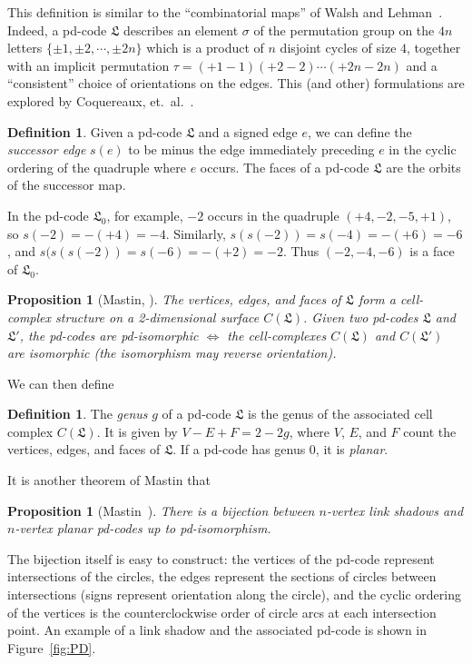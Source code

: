 \documentclass[amsmath,secnumarabic,floatfix,amssymb,nofootinbib,nobibnotes,letterpaper,11pt,tightenlines,showkeys]{revtex4}
\newtheorem{proposition}[theorem]{Proposition}
\theoremstyle{definition}
\newtheorem{definition}[theorem]{Definition}
\begin{document}
This definition is similar to the ``combinatorial maps'' of Walsh and Lehman~\cite{Walsh1972192}. Indeed, a pd-code $\mathfrak{L}$ describes an element $\sigma$ of the permutation group on the $4n$ letters $\{\pm1,\pm2,\cdots,\pm2n\}$ which is a product of $n$ disjoint cycles of size $4$, together with an implicit permutation $\tau = (+1 -1)(+2 -2)\cdots(+2n -2n)$ and a ``consistent'' choice of orientations on the edges. This (and other) formulations are explored by Coquereaux, et.\ al.~\cite{Coquereaux:2015wv}.
\begin{definition}
Given a pd-code $\mathfrak{L}$ and a signed edge $e$, we can define the \emph{successor edge} $s(e)$ to be minus the edge immediately preceding $e$ in the cyclic ordering of the quadruple where $e$ occurs. The faces of a pd-code $\mathfrak{L}$ are the orbits of the successor map.
\end{definition}
In the pd-code $\mathfrak{L}_0$, for example, $-2$ occurs in the quadruple $(+4,-2,-5,+1)$, so $s(-2) = -(+4) = -4$. Similarly, $s(s(-2)) = s(-4) = -(+6) = -6$, and $s(s(s(-2)) = s(-6) = -(+2) = -2$. Thus $(-2,-4,-6)$ is a face of $\mathfrak{L}_0$. 
\begin{proposition}[Mastin, \cite{Mastin:2015ii}] 
The vertices, edges, and faces of $\mathfrak{L}$ form a cell-complex structure on a 2-dimensional surface $C(\mathfrak{L})$. Given two pd-codes $\mathfrak{L}$ and $\mathfrak{L'}$, the pd-codes are pd-isomorphic $\iff$ the cell-complexes $C(\mathfrak{L})$ and $C(\mathfrak{L}')$ are isomorphic (the isomorphism may reverse orientation).
\end{proposition}
We can then define
\begin{definition}
The \emph{genus} $g$ of a pd-code $\mathfrak{L}$ is the genus of the associated cell complex $C(\mathfrak{L})$. It is given by $V - E + F = 2 - 2g$, where $V$, $E$, and $F$ count the vertices, edges, and faces of $\mathfrak{L}$. If a pd-code has genus 0, it is \emph{planar}.
\end{definition}
It is another theorem of Mastin that 
\begin{proposition}[Mastin~\cite{Mastin:2015ii}]
There is a bijection between $n$-vertex link shadows and $n$-vertex \emph{planar} pd-codes up to pd-isomorphism.
\end{proposition}
The bijection itself is easy to construct: the vertices of the pd-code represent intersections of the circles, the edges represent the sections of circles between intersections (signs represent orientation along the circle), and the cyclic ordering of the vertices is the counterclockwise order of circle arcs at each intersection point. An example of a link shadow and the associated pd-code is shown in Figure~\ref{fig:PD}.
\end{document}
